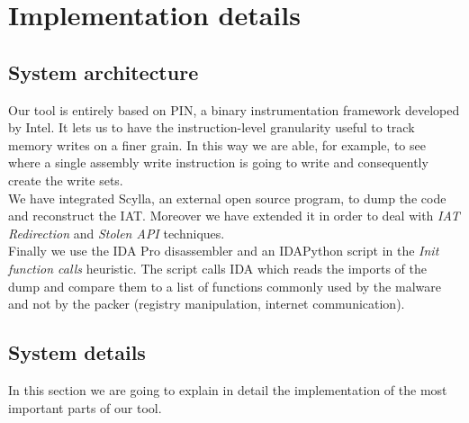 \chapter{Implementation details}
\label{chapter4}
\thispagestyle{empty}

\section{System architecture}
Our tool is entirely based on PIN, a binary instrumentation framework developed by Intel. It lets us to have the instruction-level granularity useful to track memory writes on a finer grain. In this way we are able, for example, to see where a single assembly write instruction is going to write and consequently create the write sets.\\
We have integrated Scylla, an external open source program, to dump the code and reconstruct the IAT. Moreover we have extended it in order to deal with \textit{IAT Redirection} and \textit{Stolen API} techniques.\\
Finally we use the IDA Pro disassembler and an IDAPython script in the \textit{Init function calls} heuristic. The script calls IDA which reads the imports of the dump and compare them to a list of functions commonly used by the malware and not by the packer (registry manipulation, internet communication).

\section{System details}
In this section we are going to explain in detail the implementation of the most important parts of our tool.

